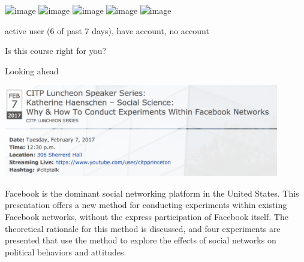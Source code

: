 \documentclass{beamer}
\def\vf{\vfill}
\begin{document}
\begin{frame}

\begin{center}
\includegraphics<1>[width=0.5\textwidth]{figures/fb_logo}
\includegraphics<2>[width=0.5\textwidth]{figures/instagram_logo}
\includegraphics<3>[width=0.5\textwidth]{figures/twitter_logo}
\includegraphics<4>[width=0.5\textwidth]{figures/yikyak_logo}
\includegraphics<5>[width=0.5\textwidth]{figures/questionmark}
\end{center}

active user (6 of past 7 days), have account, no account

\end{frame}
\begin{frame}

\begin{center}
\Large{Is this course right for you?}
\end{center}

\end{frame}
\begin{frame}

\begin{center}
\Large{Looking ahead}
\end{center}

\end{frame}
\begin{frame}

\begin{center}
\includegraphics[width=0.9\textwidth]{figures/haenschen_citp_facebook}
\end{center}

Facebook is the dominant social networking platform in the United States. This presentation offers a new method for conducting experiments within existing Facebook networks, without the express participation of Facebook itself. The theoretical rationale for this method is discussed, and four experiments are presented that use the method to explore the effects of social networks on political behaviors and attitudes. 

\vf
{}

\end{frame}
\end{document}
